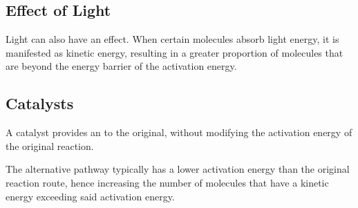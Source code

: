 

		\subsection{Effect of Light}

			Light can also have an effect. When certain molecules absorb light energy, it is manifested as kinetic energy, resulting in a
			greater proportion of molecules that are beyond the energy barrier of the activation energy.




		\subsection{Catalysts}

			A catalyst provides an  to the original, without modifying the activation energy of the original
			reaction.

			The alternative pathway typically has a lower activation energy than the original reaction route, hence increasing the number
			of molecules that have a kinetic energy exceeding said activation energy.

